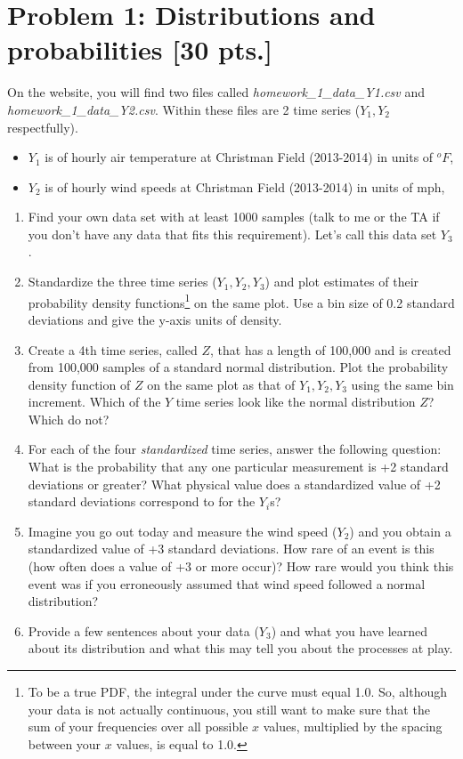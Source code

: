 \section*{Problem 1: Distributions and probabilities [30 pts.]}
On the website, you will find two files called \textit{homework\_1\_data\_Y1.csv} and \textit{homework\_1\_data\_Y2.csv}. Within these files are 2 time series ($Y_1, Y_2$ respectfully).
\begin{itemize}
\item $Y_1$ is of hourly air temperature at Christman Field (2013-2014) in units of $^oF$,
\item $Y_2$ is of hourly wind speeds at Christman Field (2013-2014) in units of mph,
\end{itemize}

\begin{enumerate}
\item Find your own data set with at least 1000 samples (talk to me or the TA if you don't have any data that fits this requirement). Let's call this data set $Y_3$.
\item Standardize the three time series ($Y_1,Y_2,Y_3$) and plot estimates of their probability density functions\footnote{To be a true PDF, the integral under the curve must equal 1.0. So, although your data is not actually continuous, you still want to make sure that the sum of your frequencies over all possible $x$ values, multiplied by the spacing between your $x$ values, is equal to 1.0.} on the same plot. Use a bin size of 0.2 standard deviations and give the y-axis units of density.

\item Create a 4th time series, called $Z$, that has a length of 100,000 and is created from 100,000 samples of a standard normal distribution. Plot the probability density function of $Z$ on the same plot as that of $Y_1,Y_2,Y_3$ using the same bin increment. Which of the $Y$ time series look like the normal distribution $Z$? Which do not?

\item For each of the four \textit{standardized} time series, answer the following question: What is the probability that any one particular measurement is +2 standard deviations or greater? What physical value does a standardized value of +2 standard deviations correspond to for the $Y_i$s?

\item Imagine you go out today and measure the wind speed ($Y_2$) and you obtain a standardized value of +3 standard deviations. How rare of an event is this (how often does a value of +3 or more occur)? How rare would you think this event was if you erroneously assumed that wind speed followed a normal distribution?

\item Provide a few sentences about your data ($Y_3$) and what you have learned about its distribution and what this may tell you about the processes at play.

\end{enumerate}

